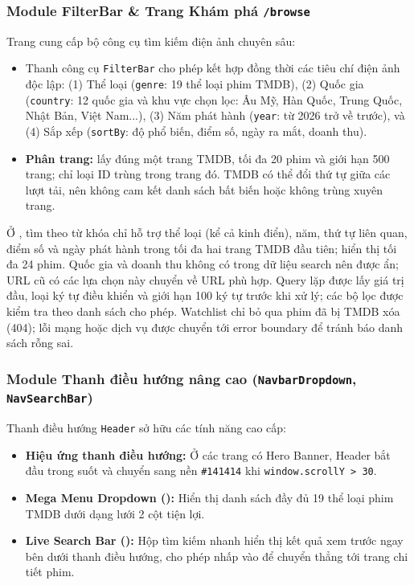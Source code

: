 \documentclass[12pt,a4paper]{extarticle}
\begin{document}
\subsubsection{Module FilterBar \& Trang Khám phá \texttt{/browse}}
Trang  cung cấp bộ công cụ tìm kiếm điện ảnh chuyên sâu:
\begin{itemize}[noitemsep]
    \item Thanh công cụ \texttt{FilterBar} cho phép kết hợp đồng thời các tiêu chí điện ảnh độc lập: (1) Thể loại (\texttt{genre}: 19 thể loại phim TMDB), (2) Quốc gia (\texttt{country}: 12 quốc gia và khu vực chọn lọc: Âu Mỹ, Hàn Quốc, Trung Quốc, Nhật Bản, Việt Nam...), (3) Năm phát hành (\texttt{year}: từ 2026 trở về trước), và (4) Sắp xếp (\texttt{sortBy}: độ phổ biến, điểm số, ngày ra mắt, doanh thu).
    \item \textbf{Phân trang:}  lấy đúng một trang TMDB, tối đa 20 phim và giới hạn 500 trang; chỉ loại ID trùng trong trang đó. TMDB có thể đổi thứ tự giữa các lượt tải, nên không cam kết danh sách bất biến hoặc không trùng xuyên trang.
\end{itemize}

Ở , tìm theo từ khóa chỉ hỗ trợ thể loại (kể cả kinh điển), năm, thứ tự liên quan, điểm số và ngày phát hành trong tối đa hai trang TMDB đầu tiên; hiển thị tối đa 24 phim. Quốc gia và doanh thu không có trong dữ liệu search nên được ẩn; URL cũ có các lựa chọn này chuyển về URL phù hợp. Query lặp được lấy giá trị đầu, loại ký tự điều khiển và giới hạn 100 ký tự trước khi xử lý; các bộ lọc được kiểm tra theo danh sách cho phép. Watchlist chỉ bỏ qua phim đã bị TMDB xóa (404); lỗi mạng hoặc dịch vụ được chuyển tới error boundary để tránh báo danh sách rỗng sai.

\subsubsection{Module Thanh điều hướng nâng cao (\texttt{NavbarDropdown}, \texttt{NavSearchBar})}
Thanh điều hướng \texttt{Header} sở hữu các tính năng cao cấp:
\begin{itemize}[noitemsep]
    \item \textbf{Hiệu ứng thanh điều hướng:} Ở các trang có Hero Banner, Header bắt đầu trong suốt và chuyển sang nền \texttt{\#141414} khi \texttt{window.scrollY > 30}.
    \item \textbf{Mega Menu Dropdown ():} Hiển thị danh sách đầy đủ 19 thể loại phim TMDB dưới dạng lưới 2 cột tiện lợi.
    \item \textbf{Live Search Bar ():} Hộp tìm kiếm nhanh hiển thị kết quả xem trước ngay bên dưới thanh điều hướng, cho phép nhấp vào để chuyển thẳng tới trang chi tiết phim.
\end{itemize}
\end{document}
